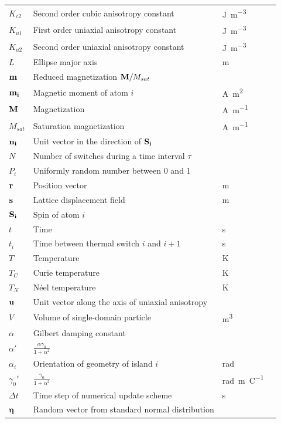 \documentclass[11pt,a4paper,english]{article}
\renewcommand{\vec}[1]{\boldsymbol{#1}}
\begin{document}
\begin{longtable}{llll}
$K_{c2}$ & Second order cubic anisotropy constant & \si{\joule\per\metre\cubed} \\
$K_{u1}$ & First order uniaxial anisotropy constant & \si{\joule\per\metre\cubed} \\
$K_{u2}$ & Second order uniaxial anisotropy constant & \si{\joule\per\metre\cubed} \\
$L$ & Ellipse major axis & \si{\metre} \\
$\vb{m}$ & Reduced magnetization $\vb{M}/M_{sat}$ &  \\
$\vb{m_i}$ & Magnetic moment of atom $i$ & \si{\ampere\metre\squared} \\
$\vb{M}$ & Magnetization & \si{\ampere\per\metre} \\
$M_{sat}$ & Saturation magnetization & \si{\ampere\per\metre} \\
$\vb{n_i}$ & Unit vector in the direction of $\vb{S_i}$ &  \\
$N$ & Number of switches during a time interval $\tau$ &  \\
$P_i$ & Uniformly random number between 0 and 1 &  \\
$\vb{r}$ & Position vector & \si{\metre} \\
$\vb{s}$ & Lattice displacement field & \si{\metre} \\
$\vb{S_i}$ & Spin of atom $i$ &  \\
$t$ & Time & \si{\second} \\
$t_i$ & Time between thermal switch $i$ and $i+1$ & \si{\second} \\
$T$ & Temperature & \si{\kelvin} \\
$T_C$ & Curie temperature & \si{\kelvin} \\
$T_N$ & N\'{e}el temperature & \si{\kelvin} \\
$\vb{u}$ & Unit vector along the axis of uniaxial anisotropy &  \\
$V$ & Volume of single-domain particle & \si{\metre\cubed} \\
\midrule
$\alpha$ & Gilbert damping constant &  \\
$\alpha'$ & $\frac{\alpha \gamma_0}{1+\alpha^2}$ &  \\
$\alpha_i$ & Orientation of geometry of island $i$ & \si{\radian} \\
$\gamma_0'$ & $\frac{\gamma_0}{1+\alpha^2}$ & \si{\radian\metre\per\coulomb} \\
$\Delta t$ & Time step of numerical update scheme & \si{\second} \\
$\vec{\eta}$ & Random vector from standard normal distribution &  \\

\end{longtable}
\end{document}
